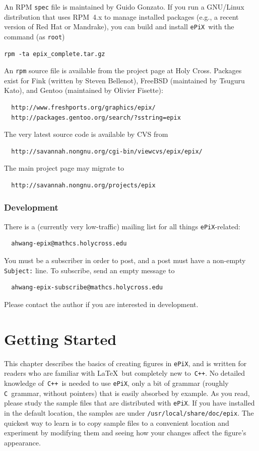 \documentclass[12pt]{report}
\newcommand{\code}[1]{\texttt{#1}}
\newcommand{\filename}[1]{\texttt{#1}}
\newcommand{\ePiX}{\code{ePiX}}
\newcommand{\CXX}{\code{C++}}
\begin{document}
An RPM \filename{spec} file is maintained by Guido Gonzato. If you run
a GNU/Linux distribution that uses RPM~4.x to manage installed
packages (e.g., a recent version of Red Hat or Mandrake), you can
build and install \ePiX\ with the command (as \code{root})
\begin{verbatim}
rpm -ta epix_complete.tar.gz
\end{verbatim}
An \filename{rpm} source file is available from the project page at
Holy Cross. Packages exist for Fink (written by Steven Bellenot),
FreeBSD (maintained by Tsuguru Kato), and Gentoo (maintained by
Olivier Fisette):
\begin{verbatim}
  http://www.freshports.org/graphics/epix/
  http://packages.gentoo.org/search/?sstring=epix
\end{verbatim}
The very latest source code is available by CVS from
\begin{verbatim}
  http://savannah.nongnu.org/cgi-bin/viewcvs/epix/epix/
\end{verbatim}
The main project page may migrate to
\begin{verbatim}
  http://savannah.nongnu.org/projects/epix
\end{verbatim}


\subsection*{Development}

There is a (currently very low-traffic) mailing list for all things
\ePiX-related:
\begin{verbatim}
  ahwang-epix@mathcs.holycross.edu
\end{verbatim}
You must be a subscriber in order to post, and a post must have a
non-empty \code{Subject:} line.  To subscribe, send an empty message
to
\begin{verbatim}
  ahwang-epix-subscribe@mathcs.holycross.edu
\end{verbatim}
Please contact the author if you are interested in development.


\chapter{Getting Started}
\label{chapter:started}

This chapter describes the basics of creating figures in \ePiX, and is
written for readers who are familiar with \LaTeX\ but completely new
to~\CXX. No detailed knowledge of~\CXX\ is needed to use \ePiX, only a
bit of grammar (roughly \code{C}~grammar, without pointers) that is
easily absorbed by example.  As you read, please study the sample
files that are distributed with \ePiX. If you have installed in the
default location, the samples are under
\filename{/usr/local/share/doc/epix}. The quickest way to learn is to
copy sample files to a convenient location and experiment by modifying
them and seeing how your changes affect the figure's appearance.
\end{document}
